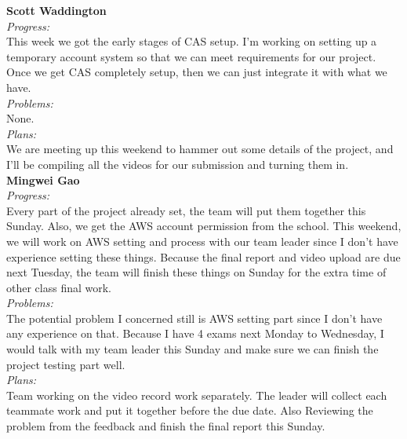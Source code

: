 \noindent\textbf{Scott Waddington}\\
\noindent\textit{Progress:}\\
This week we got the early stages of CAS setup. I'm working on setting up a temporary account system so that we can meet requirements for our project. Once we get CAS completely setup, then we can just integrate it with what we have.\\

\noindent\textit{Problems:}\\
\noindent None.\\

\noindent\textit{Plans:}\\
\noindent We are meeting up this weekend to hammer out some details of the project, and I'll be compiling all the videos for our submission and turning them in.\\

\noindent\textbf{Mingwei Gao}\\
\noindent\textit{Progress:}\\
Every part of the project already set, the team will put them together this Sunday. Also, we get the AWS account permission from the school. This weekend, we will work on AWS setting and process with our team leader since I don't have experience setting these things. Because the final report and video upload are due next Tuesday, the team will finish these things on Sunday for the extra time of other class final work.\\

\noindent\textit{Problems:}\\
\noindent The potential problem I concerned still is AWS setting part since I don't have any experience on that. Because I have 4 exams next Monday to Wednesday, I would talk with my team leader this Sunday and make sure we can finish the project testing part well.\\

\noindent\textit{Plans:}\\
\noindent Team working on the video record work separately. The leader will collect each teammate work and put it together before the due date. Also Reviewing the problem from the feedback and finish the final report this Sunday.\\